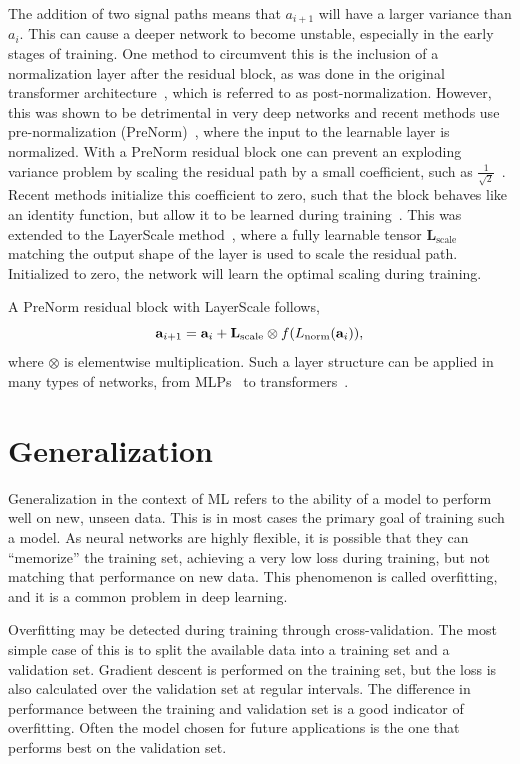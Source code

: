 The addition of two signal paths means that $a_{i+1}$ will have a larger variance than $a_i$.
This can cause a deeper network to become unstable, especially in the early stages of training.
One method to circumvent this is the inclusion of a normalization layer after the residual block, as was done in the original transformer architecture~\cite{Attention}, which is referred to as post-normalization.
However, this was shown to be detrimental in very deep networks and recent methods use pre-normalization (PreNorm)~\cite{PreLN}, where the input to the learnable layer is normalized.
With a PreNorm residual block one can prevent an exploding variance problem by scaling the residual path by a small coefficient, such as $\frac{1}{\sqrt{2}}$~\cite{StyleGAN2}.
Recent methods initialize this coefficient to zero, such that the block behaves like an identity function, but allow it to be learned during training~\cite{ReZero, SkipInit, Fixup}.
This was extended to the LayerScale method~\cite{GoingDeeper}, where a fully learnable tensor $\mathbf{L}_\text{scale}$ matching the output shape of the layer is used to scale the residual path.
Initialized to zero, the network will learn the optimal scaling during training.

A PreNorm residual block with LayerScale follows,
\begin{equation}
    \mathbf{a}_{i+1} = \mathbf{a}_i + \mathbf{L}_\text{scale} \otimes f( L_{\text{norm}}(\mathbf{a}_i) ),
\end{equation}
where $\otimes$ is elementwise multiplication.
Such a layer structure can be applied in many types of networks, from MLPs~\cite{InvertedBottleneck} to transformers~\cite{GoingDeeper}.

\section{Generalization}

Generalization in the context of ML refers to the ability of a model to perform well on new, unseen data.
This is in most cases the primary goal of training such a model.
As neural networks are highly flexible, it is possible that they can ``memorize'' the training set, achieving a very low loss during training, but not matching that performance on new data.
This phenomenon is called overfitting, and it is a common problem in deep learning.

Overfitting may be detected during training through cross-validation.
The most simple case of this is to split the available data into a training set and a validation set.
Gradient descent is performed on the training set, but the loss is also calculated over the validation set at regular intervals.
The difference in performance between the training and validation set is a good indicator of overfitting.
Often the model chosen for future applications is the one that performs best on the validation set.

